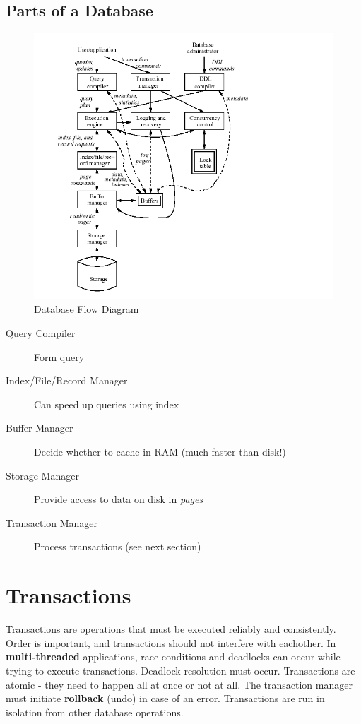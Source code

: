 \documentclass{article}
\begin{document}
\subsection{Parts of a Database}

\begin{figure}[H]
    \centering
    \includegraphics[scale=0.5]{dbms}
    \caption{Database Flow Diagram}
\end{figure}
\begin{description}
    \item[Query Compiler] {Form query}
    \item[Index/File/Record Manager] {Can speed up queries using index}
    \item[Buffer Manager] {Decide whether to cache in RAM (much faster than disk!)}
    \item[Storage Manager] {Provide access to data on disk in \emph{pages}}
    \item[Transaction Manager] {Process transactions (see next section)}
\end{description}

\section{Transactions}
Transactions are operations that must be executed reliably and consistently.
Order is important, and transactions should not interfere with eachother.
In \textbf{multi-threaded} applications, race-conditions and deadlocks can occur
while trying to execute transactions. Deadlock resolution must occur.
Transactions are atomic - they need to happen all at once or not at all.
The transaction manager must initiate \textbf{rollback} (undo) in case of an
error. Transactions are run in isolation from other database operations. 
\end{document}
